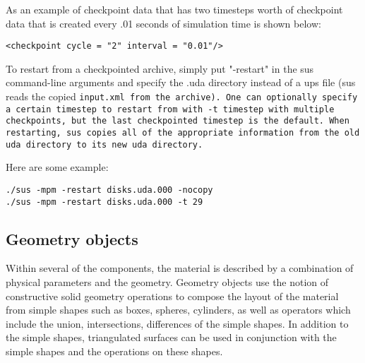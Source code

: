 As an example of checkpoint data that has two timesteps worth of
checkpoint data that is created every .01 seconds of simulation time
is shown below:

\begin{Verbatim}[fontsize=\footnotesize]
<checkpoint cycle = "2" interval = "0.01"/>
\end{Verbatim}


To restart from a checkpointed archive, simply put "-restart" in the
sus command-line arguments and specify the .uda directory instead of
a ups file (sus reads the copied \tt input.xml \normalfont from the
archive).  One can optionally specify a certain timestep to restart
from with \tt -t timestep \normalfont with multiple checkpoints, but the
last checkpointed timestep is the default.  When restarting, sus
copies all of the appropriate information from the old uda directory to its
new uda directory.

Here are some example:

\begin{Verbatim}[fontsize=\footnotesize]
./sus -mpm -restart disks.uda.000 -nocopy
./sus -mpm -restart disks.uda.000 -t 29
\end{Verbatim}
%
\subsection{Geometry objects} \label{Sec:GeometryObjects}

Within several of the components, the material is described by a
combination of physical parameters and the geometry.  Geometry objects
use the notion of constructive solid geometry operations to compose
the layout of the material from simple shapes such as boxes, spheres,
cylinders, as well as operators which include the union,
intersections, differences of the simple shapes.  In addition to the
simple shapes, triangulated surfaces can be used in conjunction with
the simple shapes and the operations on these shapes.

